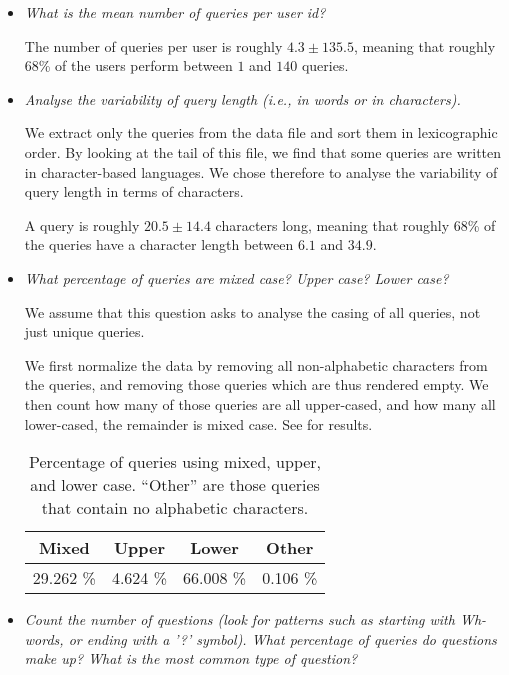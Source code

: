 \begin{itemize}

\item \emph{What is the mean number of queries per user id?}

The number of queries per user is roughly $4.3\pm135.5$, meaning that roughly
68\% of the users perform between $1$ and $140$ queries.

\item \emph{Analyse the variability of query length (i.e., in words or in
characters).}

We extract only the queries from the data file and sort them in lexicographic
order. By looking at the tail of this file, we find that some queries are
written in character-based languages. We chose therefore to analyse the
variability of query length in terms of characters.

A query is roughly $20.5\pm 14.4$ characters long, meaning that roughly 68\% of
the queries have a character length between $6.1$ and $34.9$.

\item \emph{What percentage of queries are mixed case? Upper case? Lower case?}

We assume that this question asks to analyse the casing of all queries, not
just unique queries.

We first normalize the data by removing all non-alphabetic characters from the
queries, and removing those queries which are thus rendered empty. We then
count how many of those queries are all upper-cased, and how many all
lower-cased, the remainder is mixed case. See  for
results.

\begin{table}[h!]
\centering
\begin{tabular}{|c|c|c|c|}
\hline
\textbf{Mixed} & \textbf{Upper} & \textbf{Lower} & \textbf{Other} \\
\hline
29.262 \%      & 4.624 \%       & 66.008 \%      & 0.106 \% \\
\hline
\end{tabular}
\caption[]{Percentage of queries using mixed, upper, and lower case. ``Other''
are those queries that contain no alphabetic characters.}
\label{table:casing}
\end{table}

\item \emph{Count the number of questions (look for patterns such as starting
with Wh-words, or ending with a '?'    symbol). What percentage of queries do
questions make up? What is the most common type of question?}


\end{itemize}
